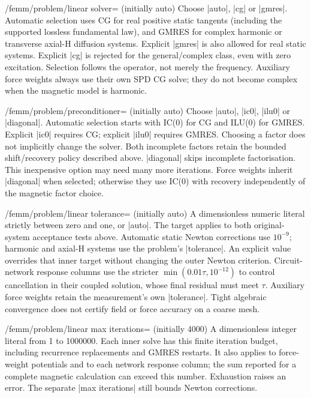 \begin{key}{/femm/problem/linear solver= (initially auto)}
Choose |auto|, |cg| or |gmres|. Automatic selection uses CG for real positive
static tangents (including the supported lossless fundamental law), and GMRES
for complex harmonic or transverse axial-H diffusion systems. Explicit |gmres|
is also allowed for real static systems. Explicit |cg| is rejected for the
general/complex class, even with zero excitation. Selection follows the operator,
not merely the frequency. Auxiliary force weights always use their own SPD CG
solve; they do not become complex when the magnetic model is harmonic.
\end{key}
\begin{key}{/femm/problem/preconditioner= (initially auto)}
Choose |auto|, |ic0|, |ilu0| or |diagonal|. Automatic selection starts with IC(0)
for CG and ILU(0) for GMRES. Explicit |ic0| requires CG; explicit |ilu0| requires
GMRES. Choosing a factor does not implicitly change the solver. Both incomplete
factors retain the bounded shift/recovery policy described above. |diagonal|
skips incomplete factorisation. This inexpensive option may need many more
iterations. Force weights inherit |diagonal| when selected; otherwise they use
IC(0) with recovery independently of the magnetic factor choice.
\end{key}
\begin{key}{/femm/problem/linear tolerance= (initially auto)}
A dimensionless numeric literal strictly between zero and one, or |auto|.
The target applies to both original-system acceptance tests above. Automatic
static Newton corrections use $10^{-9}$; harmonic and axial-H systems use the
problem's |tolerance|. An explicit value overrides that inner target without
changing the outer Newton criterion. Circuit-network response columns use the
stricter $\min(0.01\tau,10^{-12})$ to control cancellation in their coupled
solution, whose final residual must meet $\tau$. Auxiliary force weights retain
the measurement's own |tolerance|. Tight algebraic convergence does not certify
field or force accuracy on a coarse mesh.
\end{key}
\begin{key}{/femm/problem/linear max iterations= (initially 4000)}
A dimensionless integer literal from 1 to 1000000. Each inner solve has this
finite iteration budget, including recurrence replacements and GMRES restarts.
It also applies to force-weight potentials and to each network response column;
the sum reported for a complete magnetic calculation can exceed this number.
Exhaustion raises an error. The separate |max iterations| still bounds Newton
corrections.
\end{key}
